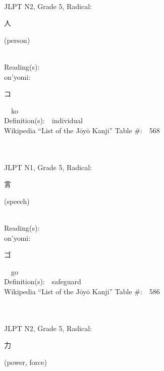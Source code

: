 \begin{multicols}{2}
{\fontsize{34pt}{40pt}  }\ \ \\  %
{JLPT N2, Grade 5, Radical:\ \ {\begin{CJK}{UTF8}{min} 人 \end{CJK}} (person) } \\
Reading(s):\ \ \\
{\hspace*{1em}}on'yomi:\ \ \\
{\hspace*{2em}}{\begin{CJK}{UTF8}{min} コ \end{CJK}}\ \ ko\ \ \\
Definition(s):\ \ individual \\
Wikipedia ``List of the J\=oy\=o Kanji'' Table \#:\ \ 568 \\
\ \ \\
{\fontsize{34pt}{40pt}  }\ \ \\  %
{JLPT N1, Grade 5, Radical:\ \ {\begin{CJK}{UTF8}{min} 言 \end{CJK}} (speech) } \\
Reading(s):\ \ \\
{\hspace*{1em}}on'yomi:\ \ \\
{\hspace*{2em}}{\begin{CJK}{UTF8}{min} ゴ \end{CJK}}\ \ go\ \ \\
Definition(s):\ \ safeguard \\
Wikipedia ``List of the J\=oy\=o Kanji'' Table \#:\ \ 586 \\
\ \ \\
{\fontsize{34pt}{40pt}  }\ \ \\  %
{JLPT N2, Grade 5, Radical:\ \ {\begin{CJK}{UTF8}{min} 力 \end{CJK}} (power, force) } \\

\end{multicols}
